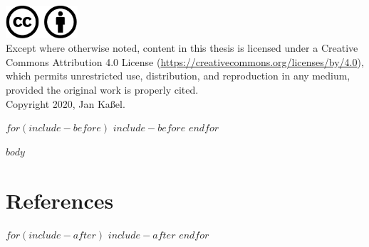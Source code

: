 \documentclass[a4paper,headings=standardclasses]{report}
\begin{document}
\begin{center}
  \begin{minipage}[t]{0.85\textwidth}
    {\centering\includegraphics[width=0.2\textwidth]{layout/cc-by.pdf}} \\

    Except where otherwise noted, content in this thesis is licensed under a Creative Commons Attribution 4.0 License (\url{https://creativecommons.org/licenses/by/4.0}), which permits unrestricted use, distribution, and reproduction in any medium, provided the original work is properly cited. \\

    \vspace{1mm}
    Copyright 2020, Jan Kaßel.
  \end{minipage}
\end{center}
\pagebreak

\tableofcontents
\newpage

$for(include-before)$
  $include-before$
$endfor$

$body$

{
  \footnotesize
  \chapter{References}
  \printbibliography
}
\newpage

$for(include-after)$
  $include-after$
$endfor$
\end{document}
